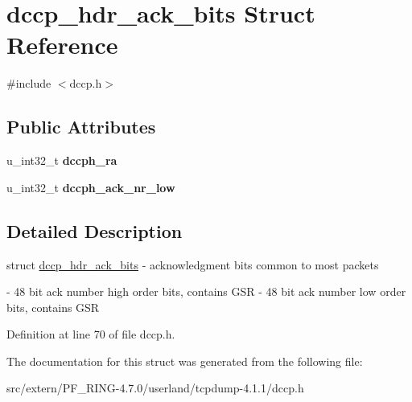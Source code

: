 \hypertarget{structdccp__hdr__ack__bits}{
\section{dccp\_\-hdr\_\-ack\_\-bits Struct Reference}
\label{structdccp__hdr__ack__bits}
}


{\ttfamily \#include $<$dccp.h$>$}

\subsection*{Public Attributes}
\begin{DoxyCompactItemize}
\item 
\hypertarget{structdccp__hdr__ack__bits_a6637d6d4a7405a767b60e466aa856d18}{
u\_\-int32\_\-t {\bfseries dccph\_\-ra}}
\label{structdccp__hdr__ack__bits_a6637d6d4a7405a767b60e466aa856d18}

\item 
\hypertarget{structdccp__hdr__ack__bits_aff82272fb20eb05ea95845e8d05d6dfb}{
u\_\-int32\_\-t {\bfseries dccph\_\-ack\_\-nr\_\-low}}
\label{structdccp__hdr__ack__bits_aff82272fb20eb05ea95845e8d05d6dfb}

\end{DoxyCompactItemize}


\subsection{Detailed Description}
struct \hyperlink{structdccp__hdr__ack__bits}{dccp\_\-hdr\_\-ack\_\-bits} -\/ acknowledgment bits common to most packets

-\/ 48 bit ack number high order bits, contains GSR  -\/ 48 bit ack number low order bits, contains GSR 

Definition at line 70 of file dccp.h.



The documentation for this struct was generated from the following file:\begin{DoxyCompactItemize}
\item 
src/extern/PF\_\-RING-\/4.7.0/userland/tcpdump-\/4.1.1/dccp.h\end{DoxyCompactItemize}
